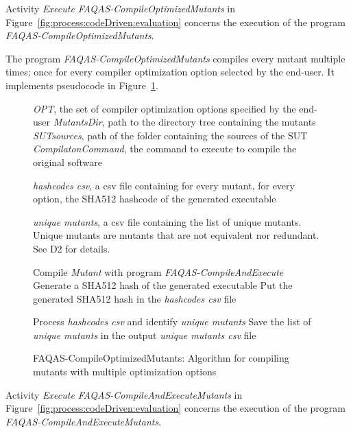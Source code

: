 \RQ{} Activity \emph{Execute FAQAS-CompileOptimizedMutants} in Figure~\ref{fig:process:codeDriven:evaluation} concerns the execution of the program \emph{FAQAS-CompileOptimizedMutants}.

\RQ{} The program \emph{FAQAS-CompileOptimizedMutants} compiles every mutant multiple times; once for every compiler optimization option selected by the end-user. It implements pseudocode in Figure~\ref{alg:CompileOptimizedMutants}.

\begin{figure}[h]
\begin{algorithmic}[1]

\scriptsize


\Require \emph{OPT}, the set of compiler optimization options specified by the end-user
\Require \emph{MutantsDir}, path to the directory tree containing the mutants
\Require \emph{SUTsources}, path of the folder containing the sources of the SUT
\Require \emph{CompilatonCommand}, the command to execute to compile the original software

\Ensure \emph{hashcodes csv}, a csv file containing for every mutant, for every option, the SHA512 hashcode of the generated executable

\Ensure \emph{unique mutants}, a csv file containing the list of unique mutants. Unique mutants are mutants that are not equivalent nor redundant. See D2 for details.

\State Compile \emph{Mutant} with program \emph{FAQAS-CompileAndExecute}
\State Generate a SHA512 hash of the generated executable
\State Put the generated SHA512 hash in the \emph{hashcodes csv} file
\EndFor
\EndFor

\State Process \emph{hashcodes csv} and identify \emph{unique mutants}
\State Save the list of \emph{unique mutants} in the output \emph{unique mutants csv} file

\end{algorithmic}
\vspace{-3mm}
\caption{FAQAS-CompileOptimizedMutants: Algorithm for compiling mutants with multiple optimization options}
\label{alg:CompileOptimizedMutants}
\end{figure}




\RQ{} Activity \emph{Execute FAQAS-CompileAndExecuteMutants} in Figure~\ref{fig:process:codeDriven:evaluation} concerns the execution of the program \emph{FAQAS-CompileAndExecuteMutants}.

